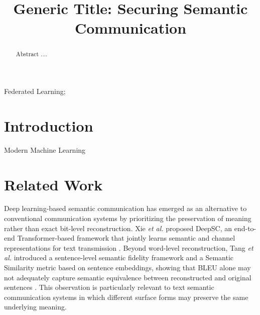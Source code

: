 \documentclass[conference]{IEEEtran}
\begin{document}
\title{Generic Title: Securing Semantic Communication}



\author{
}
\maketitle

\begin{abstract}

Abstract ....

\end{abstract}

\begin{IEEEkeywords}
Federated Learning;
\end{IEEEkeywords}

\section{Introduction}
Modern Machine Learning

\section{Related Work}

Deep learning-based semantic communication has emerged as an alternative to conventional communication systems by prioritizing the preservation of meaning rather than exact bit-level reconstruction. Xie \textit{et al.} proposed DeepSC, an end-to-end Transformer-based framework that jointly learns semantic and channel representations for text transmission \cite{xie2021deepsc}. Beyond word-level reconstruction, Tang \textit{et al.} introduced a sentence-level semantic fidelity framework and a Semantic Similarity metric based on sentence embeddings, showing that BLEU alone may not adequately capture semantic equivalence between reconstructed and original sentences \cite{tang2023semanticfidelity}. This observation is particularly relevant to text semantic communication systems in which different surface forms may preserve the same underlying meaning.
\end{document}
